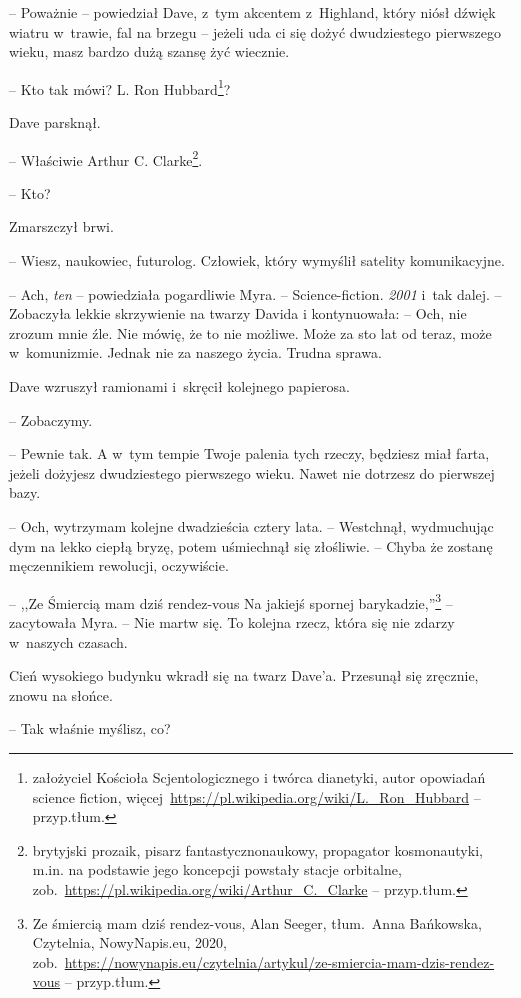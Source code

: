 \documentclass[oneside,polish,11pt,sfheadings]{mwbk}
\begin{document}
-- Poważnie -- powiedział Dave, z~tym akcentem z~Highland, który niósł
dźwięk wiatru w~trawie, fal na brzegu -- jeżeli uda ci się dożyć
dwudziestego pierwszego wieku, masz bardzo dużą szansę żyć wiecznie.

-- Kto tak mówi? L. Ron Hubbard\footnote{założyciel Kościoła Scjentologicznego
i twórca dianetyki, autor opowiadań science fiction,
więcej~\url{https://pl.wikipedia.org/wiki/L.\_Ron\_Hubbard} -- przyp.tłum.}?

Dave parsknął. 

-- Właściwie Arthur C. Clarke\footnote{ brytyjski prozaik,
pisarz fantastycznonaukowy, propagator kosmonautyki, m.in. na podstawie
jego koncepcji powstały stacje orbitalne,
zob.~\url{https://pl.wikipedia.org/wiki/Arthur\_C.\_Clarke} -- przyp.tłum.}.

-- Kto?

Zmarszczył brwi. 

-- Wiesz, naukowiec, futurolog. Człowiek, który wymyślił
satelity komunikacyjne.

-- Ach, \textit{ten} -- powiedziała pogardliwie Myra. -- Science-fiction.
\textit{2001} i~tak dalej. -- Zobaczyła lekkie skrzywienie na twarzy Davida
i kontynuowała: -- Och, nie zrozum mnie źle. Nie mówię, że to nie
możliwe. Może za sto lat od teraz, może w~komunizmie. Jednak nie za
naszego życia. Trudna sprawa.

Dave wzruszył ramionami i~skręcił kolejnego papierosa.

-- Zobaczymy.

-- Pewnie tak. A w~tym tempie Twoje palenia tych rzeczy, będziesz miał
farta, jeżeli dożyjesz dwudziestego pierwszego wieku. Nawet nie dotrzesz
do pierwszej bazy.

-- Och, wytrzymam kolejne dwadzieścia cztery lata. -- Westchnął,
wydmuchując dym na lekko ciepłą bryzę, potem uśmiechnął się złośliwie. -- Chyba że zostanę męczennikiem rewolucji, oczywiście.

-- ,,Ze Śmiercią mam dziś rendez-vous Na jakiejś spornej
barykadzie,''\footnote{ Ze śmiercią mam dziś rendez-vous, Alan Seeger,
tłum.~Anna Bańkowska, Czytelnia, NowyNapis.eu, 2020,
zob.~\url{https://nowynapis.eu/czytelnia/artykul/ze-smiercia-mam-dzis-rendez-vous}
-- przyp.tłum.} -- zacytowała Myra. -- Nie martw się. To kolejna rzecz,
która się nie zdarzy w~naszych czasach.

Cień wysokiego budynku wkradł się na twarz Dave'a. Przesunął się
zręcznie, znowu na słońce.

-- Tak właśnie myślisz, co?
\end{document}

